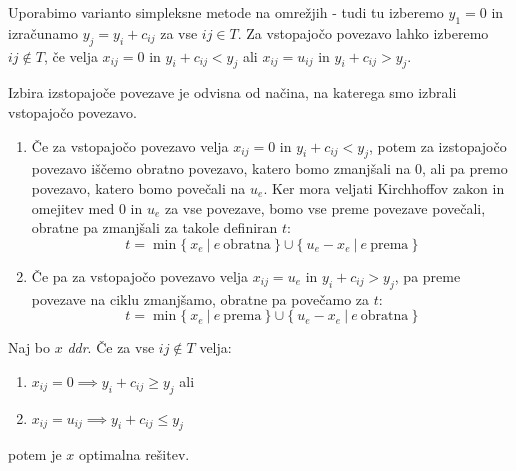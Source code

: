 \documentclass[11pt, a4paper]{article}
\begin{document}
    Uporabimo varianto simpleksne metode na omrežjih - tudi tu izberemo \(y_1 = 0\) in izračunamo \(y_j = y_i + c_{ij}\) za vse \(ij \in T\). Za vstopajočo povezavo lahko izberemo \(ij \notin T\), če velja \(x_{ij} = 0\) in \(y_i + c_{ij} < y_j\) ali \(x_{ij} = u_{ij}\) in \(y_i + c_{ij} > y_j\).
    \par
    Izbira izstopajoče povezave je odvisna od načina, na katerega smo izbrali vstopajočo povezavo.
    \begin{enumerate}[label=(\alph*)]
        \item Če za vstopajočo povezavo velja \(x_{ij}=0\) in \(y_i+c_{ij} < y_j\), potem za izstopajočo povezavo iščemo obratno povezavo, katero bomo zmanjšali na 0, ali pa premo povezavo, katero bomo povečali na \(u_e\). Ker mora veljati Kirchhoffov zakon in omejitev med 0 in \(u_e\) za vse povezave, bomo vse preme povezave povečali, obratne pa zmanjšali za takole definiran \(t\):
            \[
                t = \min \{\ x_e\ |\ e\ \text{obratna}\ \} \cup \{\ u_e - x_e\ |\ e\ \text{prema}\ \}
            \]
        \item Če pa za vstopajočo povezavo velja \(x_{ij}=u_e\) in \(y_i+c_{ij} > y_j\), pa preme povezave na ciklu zmanjšamo, obratne pa povečamo za \(t\):
            \[
                t = \min \{\ x_e\ |\ e\ \text{prema}\ \} \cup \{\ u_e - x_e\ |\ e\ \text{obratna}\ \}  
            \]
    \end{enumerate}

    \begin{theorem}
        Naj bo \(x\) \textit{ddr}. Če za vse \(ij \notin T\) velja:
        \begin{enumerate}[label=(\alph*)]
            \item \(x_{ij}=0 \implies y_i+c_{ij} \ge y_j\) ali
            \item \(x_{ij}=u_{ij} \implies y_i+c_{ij} \le y_j\)
        \end{enumerate}

        potem je \(x\) optimalna rešitev.
    \end{theorem}
        
\end{document}
